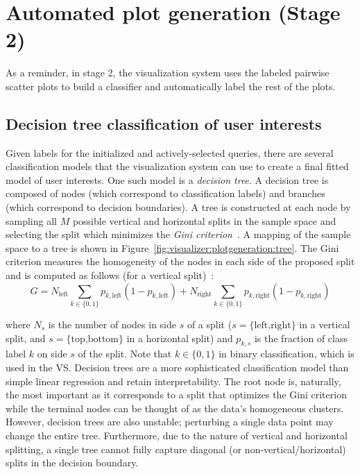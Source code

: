 \section{Automated plot generation (Stage 2)}
\label{sec:visualizer:plotgeneration}

As a reminder, in stage 2, the visualization system uses the labeled pairwise 
scatter plots to build a classifier and automatically label the rest of the 
plots.

\subsection{Decision tree classification of user interests}
\label{sec:visualizer:plotgeneration:tree}

Given labels for the initialized and actively-selected queries, there are 
several classification models that the visualization system can use to create a 
final fitted model of user interests. One such model is a \textit{decision 
tree}. A decision tree is composed of nodes (which correspond to 
classification labels) and branches (which correspond to decision boundaries). 
A tree is constructed at each node by sampling all $M$ possible vertical and 
horizontal splits in the sample space and selecting the split which minimizes 
the \textit{Gini criterion}~\cite{cutler2010}. A mapping of the sample space to 
a tree is shown in Figure~\ref{fig:visualizer:plotgeneration:tree}. The Gini 
criterion measures the homogeneity of the nodes in each side of the proposed 
split and is computed as follows (for a vertical split)~\cite{cutler2010}:
$$G = N_{\text{left}} \sum\limits_{k\in \{0,1\}} p_{k,\text{left}} 
(1-p_{k,\text{left}}) + N_{\text{right}} 
\sum\limits_{k \in \{0,1\}}  p_{k,\text{right}}(1-p_{k,\text{right}})$$

\noindent where $N_s$ is the number of nodes in side $s$ of a split ($s = 
\{\text{left,right}\}$ in a vertical split, and $s = \{\text{top,bottom}\}$ in 
a horizontal split) and $p_{k,s}$ is the fraction of class label $k$ on side 
$s$ of the split. Note that $k \in \{0,1\}$ in binary classification, which is 
used in the VS. Decision trees are a more sophisticated classification model 
than simple linear regression and retain interpretability. The root node is, 
naturally, the most important as it corresponds to a split that optimizes the 
Gini criterion while the terminal nodes can be thought of as the data's 
homogeneous clusters. However, decision trees are also unstable; perturbing a 
single data point may change the entire tree. Furthermore, due to the nature of 
vertical and horizontal splitting, a single tree cannot fully capture diagonal 
(or non-vertical/horizontal) splits in the decision boundary.

